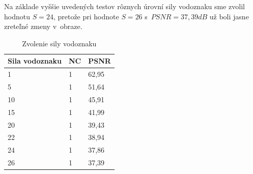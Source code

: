 Na základe vyššie uvedených testov rôznych úrovní sily vodoznaku sme zvolil hodnotu $S=24$, pretože pri hodnote $S=26$ s~$PSNR=37,39dB$ už boli jasne zreteľné zmeny v~obraze. 
\clearpage

\begin{table}[ht]
\centering
\label{wm-strength}
\begin{tabular}{lll}
\hline
\multicolumn{1}{c}{\textbf{Sila vodoznaku}} & \multicolumn{1}{c}{\textbf{NC}} & \multicolumn{1}{c}{\textbf{PSNR}} \\ \hline
1                              & 1                               & 62,95 \\
5                              & 1                               & 51,64 \\
10                             & 1                               & 45,91 \\
15                             & 1                               & 41,99 \\
20                             & 1                               & 39,43 \\
22                             & 1                               & 38,94 \\
24                             & 1                               & 37,86 \\
26                             & 1                               & 37,39 \\ \hline
\end{tabular}
\caption{Zvolenie sily vodoznaku}
\end{table}

